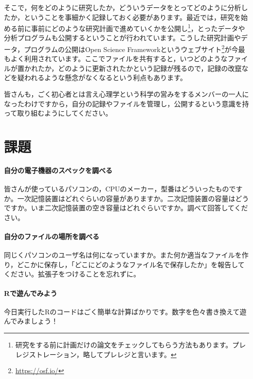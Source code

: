 \documentclass{ltjsbook}
\begin{document}
そこで，何をどのように研究したか，どういうデータをとってどのように分析したか，ということを事細かく記録しておく必要があります。最近では，研究を始める前に事前にどのような研究計画で進めていくかを公開し\footnote{研究をする前に計画だけの論文をチェックしてもらう方法もあります。プレレジストレーション，略してプレレジと言います。}，とったデータや分析プログラムも公開するということが行われています。こうした研究計画やデータ，プログラムの公開はOpen Science Frameworkというウェブサイト\footnote{\url{https://osf.io/}}が今最もよく利用されています。ここでファイルを共有すると，いつどのようなファイルが置かれたか，どのように更新されたかという記録が残るので，記録の改竄などを疑われるような懸念がなくなるという利点もあります。

皆さんも，ごく初心者とは言え心理学という科学の営みをするメンバーの一人になったわけですから，自分の記録やファイルを管理し，公開するという意識を持って取り組むようにしてください。

\section{課題}
\paragraph{自分の電子機器のスペックを調べる}
皆さんが使っているパソコンの，CPUのメーカー，型番はどういったものですか。一次記憶装置はどれぐらいの容量がありますか。二次記憶装置の容量はどうですか。いま二次記憶装置の空き容量はどれぐらいですか。調べて回答してください。
\paragraph{自分のファイルの場所を調べる}
同じくパソコンのユーザ名は何になっていますか。また何か適当なファイルを作り，どこかに保存し，「どこにどのようなファイル名で保存したか」を報告してください。拡張子をつけることを忘れずに。
\paragraph{Rで遊んでみよう}
今日実行したRのコードはごく簡単な計算ばかりです。数字を色々書き換えて遊んでみましょう！
\end{document}

